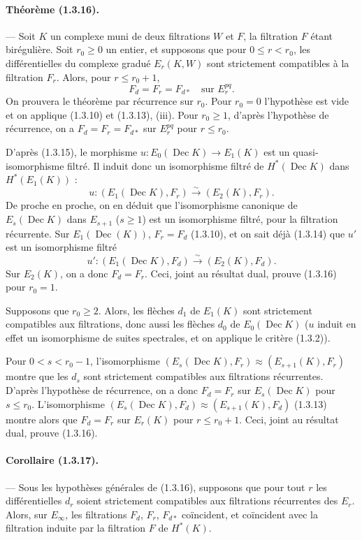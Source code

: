 \documentclass[10pt]{article}
\newcommand{\iso}{\xrightarrow{\sim}}
\newcommand{\Dec}{\operatorname{Dec}}
\begin{document}
\paragraph{Théorème (1.3.16).} --- Soit $K$ un complexe muni de deux filtrations $W$ et $F$, la filtration $F$ étant birégulière. Soit $r_0\ge0$ un entier, et supposons que pour $0\le r<r_0$, les différentielles du complexe gradué $E_r(K,W)$ sont strictement compatibles à la filtration $F_r$. Alors, pour $r\le r_0+1$,
\[
F_d=F_r=F_{d*}\quad\text{sur }E_r^{pq}.
\]
On prouvera le théorème par récurrence sur $r_0$. Pour $r_0=0$ l'hypothèse est vide et on applique (1.3.10) et (1.3.13), (iii). Pour $r_0\ge1$, d'après l'hypothèse de récurrence, on a $F_d=F_r=F_{d*}$ sur $E_r^{pq}$ pour $r\le r_0$.

D'après (1.3.15), le morphisme $u:E_0(\Dec K)\to E_1(K)$ est un quasi-isomorphisme filtré. Il induit donc un isomorphisme filtré de $H^*(\Dec K)$ dans $H^*(E_1(K))$ :
\[
u:(E_1(\Dec K),F_r)\iso(E_2(K),F_r).
\]
De proche en proche, on en déduit que l'isomorphisme canonique de $E_s(\Dec K)$ dans $E_{s+1}$ ($s\ge1$) est un isomorphisme filtré, pour la filtration récurrente. Sur $E_1(\Dec(K))$, $F_r=F_d$ (1.3.10), et on sait déjà (1.3.14) que $u'$ est un isomorphisme filtré
\[
u':(E_1(\Dec K),F_d)\iso(E_2(K),F_d).
\]
Sur $E_2(K)$, on a donc $F_d=F_r$. Ceci, joint au résultat dual, prouve (1.3.16) pour $r_0=1$.

Supposons que $r_0\ge2$. Alors, les flèches $d_1$ de $E_1(K)$ sont strictement compatibles aux filtrations, donc aussi les flèches $d_0$ de $E_0(\Dec K)$ ($u$ induit en effet un isomorphisme de suites spectrales, et on applique le critère (1.3.2)).

Pour $0<s<r_0-1$, l'isomorphisme $(E_s(\Dec K),F_r)\approx(E_{s+1}(K),F_r)$ montre que les $d_s$ sont strictement compatibles aux filtrations récurrentes. D'après l'hypothèse de récurrence, on a donc $F_d=F_r$ sur $E_s(\Dec K)$ pour $s\le r_0$. L'isomorphisme $(E_s(\Dec K),F_d)\approx(E_{s+1}(K),F_d)$ (1.3.13) montre alors que $F_d=F_r$ sur $E_r(K)$ pour $r\le r_0+1$. Ceci, joint au résultat dual, prouve (1.3.16).

\paragraph{Corollaire (1.3.17).} --- Sous les hypothèses générales de (1.3.16), supposons que pour tout $r$ les différentielles $d_r$ soient strictement compatibles aux filtrations récurrentes des $E_r$. Alors, sur $E_\infty$, les filtrations $F_d$, $F_r$, $F_{d*}$ coïncident, et coïncident avec la filtration induite par la filtration $F$ de $H^*(K)$.
\end{document}
